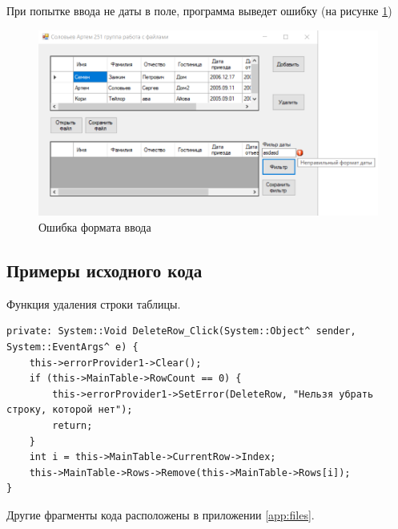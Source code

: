 При попытке ввода не даты в поле, программа выведет ошибку (на рисунке \ref{task8_launch3})
\begin{figure}[H]
    \centering
    \includegraphics[width=1\linewidth]{lections/img/task8_launch3.png}
    \caption{Ошибка формата ввода}
    \label{task8_launch3}
\end{figure}


\subsection{Примеры исходного кода}


Функция удаления строки таблицы.
\begin{verbatim}
private: System::Void DeleteRow_Click(System::Object^ sender, System::EventArgs^ e) {
	this->errorProvider1->Clear();
	if (this->MainTable->RowCount == 0) {
		this->errorProvider1->SetError(DeleteRow, "Нельзя убрать строку, которой нет");
		return;
	}
	int i = this->MainTable->CurrentRow->Index;
	this->MainTable->Rows->Remove(this->MainTable->Rows[i]);
}
\end{verbatim}
Другие фрагменты кода расположены в приложении \ref{app:files}.

\sectionbreak